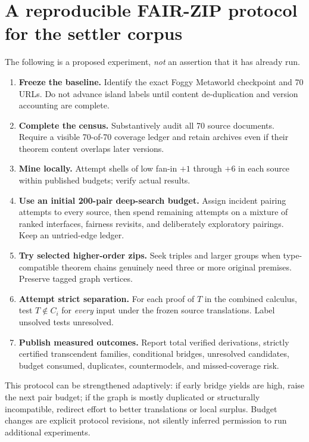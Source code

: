 \documentclass[11pt,letterpaper]{article}
\begin{document}
\section{A reproducible FAIR-ZIP protocol for the settler corpus}
The following is a proposed experiment, \emph{not} an assertion that it has already run.
\begin{enumerate}[label=\arabic*.,leftmargin=1.6em]
\item \textbf{Freeze the baseline.} Identify the exact Foggy Metaworld checkpoint and 70 URLs. Do not advance island labels until content de-duplication and version accounting are complete.
\item \textbf{Complete the census.} Substantively audit all 70 source documents. Require a visible 70-of-70 coverage ledger and retain archives even if their theorem content overlaps later versions.
\item \textbf{Mine locally.} Attempt shells of low fan-in $+1$ through $+6$ in each source within published budgets; verify actual results.
\item \textbf{Use an initial 200-pair deep-search budget.} Assign incident pairing attempts to every source, then spend remaining attempts on a mixture of ranked interfaces, fairness revisits, and deliberately exploratory pairings. Keep an untried-edge ledger.
\item \textbf{Try selected higher-order zips.} Seek triples and larger groups when type-compatible theorem chains genuinely need three or more original premises. Preserve tagged graph vertices.
\item \textbf{Attempt strict separation.} For each proof of $T$ in the combined calculus, test $T\notin C_i$ for \emph{every} input under the frozen source translations. Label unsolved tests unresolved.
\item \textbf{Publish measured outcomes.} Report total verified derivations, strictly certified transcendent families, conditional bridges, unresolved candidates, budget consumed, duplicates, countermodels, and missed-coverage risk.
\end{enumerate}

This protocol can be strengthened adaptively: if early bridge yields are high, raise the next pair budget; if the graph is mostly duplicated or structurally incompatible, redirect effort to better translations or local surplus. Budget changes are explicit protocol revisions, not silently inferred permission to run additional experiments.
\end{document}
